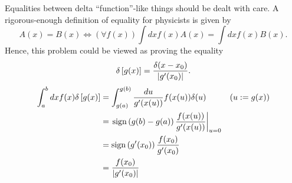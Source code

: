 \item

Equalities between delta ``function''-like things should be dealt with care.
A rigorous-enough definition of equality for physicists is given by
\[
    A(x) = B(x) \Leftrightarrow
    \left( \forall f(x) \right) \int dx f(x) A(x) = \int dx f(x) B(x).
\]
Hence, this problem could be viewed as proving the equality
\[
    \delta\left[ g(x) \right] = \frac{\delta(x - x_0)}{\left| g'(x_0) \right|}.
\]
\begin{align*}
    \int_a^b dx f(x) \delta\left[ g(x) \right]
    &= \int_{g(a)}^{g(b)} \frac{du}{g'(x(u))} f(x(u)) \delta(u) && (u := g(x)) \\
    &= {\left.  \operatorname{sign}\left( g(b) - g(a) \right) \frac{f(x(u))}{g'(x(u))}  \right|}_{u = 0} \\
    &= \operatorname{sign}\left( g'(x_0) \right) \frac{f(x_0)}{g'(x_0)} \\
    &= \frac{f(x_0)}{\left| g'(x_0) \right|}
\end{align*}